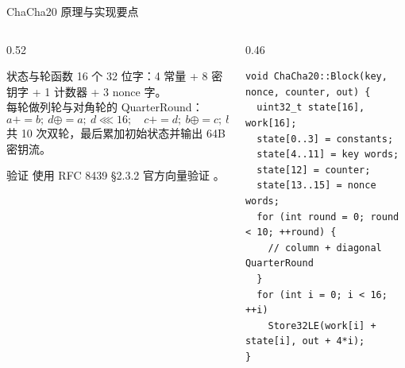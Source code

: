 \documentclass[aspectratio=169,10pt]{beamer}
\newcommand{\code}[1]{\texttt{\small\detokenize{#1}}}
\begin{document}
\begin{frame}[fragile]{ChaCha20 原理与实现要点}
  \begin{columns}[T]
    \begin{column}{0.52\textwidth}
      \begin{block}{状态与轮函数}
        \small
        16 个 32 位字：4 常量 + 8 密钥字 + 1 计数器 + 3 nonce 字。\\
        每轮做列轮与对角轮的 QuarterRound：
        \[
        a+=b;\ d\oplus=a;\ d\lll 16;\quad
        c+=d;\ b\oplus=c;\ b\lll 12
        \]
        共 10 次双轮，最后累加初始状态并输出 64B 密钥流。
      \end{block}
      \begin{block}{验证}
        \small
        使用 RFC 8439 §2.3.2 官方向量验证 \code{Block()}。
      \end{block}
    \end{column}
    \begin{column}{0.46\textwidth}
      \begin{lstlisting}[style=cppstyle,basicstyle=\ttfamily\tiny]
void ChaCha20::Block(key, nonce, counter, out) {
  uint32_t state[16], work[16];
  state[0..3] = constants;
  state[4..11] = key words;
  state[12] = counter;
  state[13..15] = nonce words;
  for (int round = 0; round < 10; ++round) {
    // column + diagonal QuarterRound
  }
  for (int i = 0; i < 16; ++i)
    Store32LE(work[i] + state[i], out + 4*i);
}
      \end{lstlisting}
      
    \end{column}
  \end{columns}
\end{frame}
\end{document}
